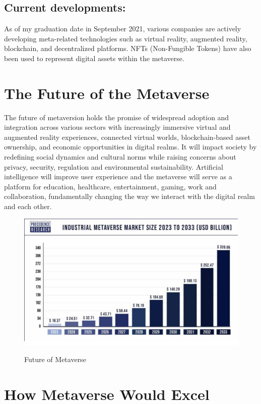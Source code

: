 \subsection{Current developments:}
As of my graduation date in September 2021, various companies are actively developing meta-related technologies such as virtual reality, augmented reality, blockchain, and decentralized platforms. NFTs (Non-Fungible Tokens) have also been used to represent digital assets within the metaverse.
\section{The Future of the Metaverse}
The future of metaversion holds the promise of widespread adoption and integration across various sectors with increasingly immersive virtual and augmented reality experiences, connected virtual worlds, blockchain-based asset ownership, and economic opportunities in digital realms. It will impact society by redefining social dynamics and cultural norms while raising concerns about privacy, security, regulation and environmental sustainability. Artificial intelligence will improve user experience and the metaverse will serve as a platform for education, healthcare, entertainment, gaming, work and collaboration, fundamentally changing the way we interact with the digital realm and each other.
\begin{figure}[h]
    \centering
    \includegraphics[width=1\linewidth]{Images/industrial-metaverse-market-size.png}
    \caption{Future of Metaverse}
    \label{fig:Future of Metaverse}\cite{metaverse-market}
\end{figure}
\section{How Metaverse Would Excel}
